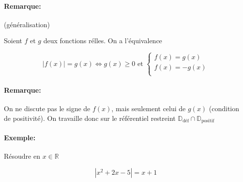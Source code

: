 \documentclass[
    11pt,
    a4paper,
    oneside,
    headinlcude, footinclude,
    twoside,
]{report}
\begin{document}
\paragraph{Remarque:}

(g\'en\'eralisation)

Soient $f$ et $g$ deux fonctions r\'elles. On a l'\'equivalence 

\begin{highlightBox}
    $$|f(x)| = g(x) \iff g(x) \geq 0 \text{ et }  \left\{
        \begin{array}{l}
        f(x)  = g(x)\\
        f(x)  = -g(x)\\
        \end{array}
    \right.$$
\end{highlightBox}

\paragraph{Remarque:}

On ne discute pas le signe de $f(x)$, mais seulement celui de $g(x)$
(condition de positivit\'e). On travaille donc sur le r\'ef\'erentiel
restreint $\mathbb{D}_{\text{d\'ef}} \cap \mathbb{D}_{\text{positif}}$

\paragraph{Exemple:}

R\'esoudre en $x \in \mathbb{R}$

$$| x^{2} + 2x - 5 | = x + 1$$
\end{document}

